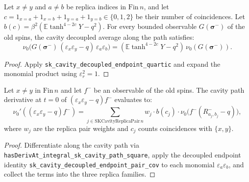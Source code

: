 \begin{lemma}
\label{lem:sg-tal:endpoint-pair-cov}
  \leanok
{}
Let $x \ne y$ and $a \ne b$ be replica indices in $\mathrm{Fin}\,n$, and let $c = 1_{x=a} + 1_{x=b} + 1_{y=a} + 1_{y=b} \in \{0, 1, 2\}$ be their number of coincidences.  Let $b(c) = \beta^2 (\mathbb E\tanh^{4-2c} Y - q^2)$.  For every bounded observable $G(\boldsymbol{\sigma}^-)$ of the old spins, the cavity decoupled average along the path satisfies:
\[
\nu_0\bigl(G(\boldsymbol{\sigma}^-)\,(\varepsilon_x \varepsilon_y - q)\,\varepsilon_a \varepsilon_b\bigr) = (\mathbb E\tanh^{4-2c} Y - q^2)\,\nu_0(G(\boldsymbol{\sigma}^-)).
\]
\end{lemma}
\begin{proof}
  \leanok
Apply \texttt{sk\_cavity\_decoupled\_endpoint\_quartic} and expand the monomial product using $\varepsilon_r^2 = 1$.
\end{proof}

\begin{theorem}
\label{thm:sg-tal:lemma-182}
  \leanok
{}
Let $x \ne y$ in $\mathrm{Fin}\,n$ and let $f^-$ be an observable of the old spins.  The cavity path derivative at $t=0$ of $(\varepsilon_x \varepsilon_y - q) f^-$ evaluates to:
\[
\nu_0'((\varepsilon_x \varepsilon_y - q) f^-) = \sum_{j \in \mathrm{SKCavityReplicaPair}\,n} w_j \cdot b(c_j) \cdot \nu_0\bigl(f^- (R^-_{a_j, b_j} - q)\bigr),
\]
where $w_j$ are the replica pair weights and $c_j$ counts coincidences with $\{x, y\}$.
\end{theorem}
\begin{proof}
  \leanok
Differentiate along the cavity path via \texttt{hasDerivAt\_integral\_sk\_cavity\_path\_square}, apply the decoupled endpoint identity \texttt{sk\_cavity\_decoupled\_endpoint\_pair\_cov} to each monomial $\varepsilon_a \varepsilon_b$, and collect the terms into the three replica families.
\end{proof}

